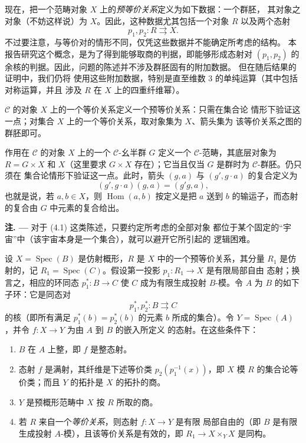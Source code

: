 现在，把一个范畴对象 $X$ 上的\emph{预等价关系}定义为如下数据：一个群胚，
其对象之对象（不妨这样说）为 $X$。因此，这种数据尤其包括一个对象 $R$
以及两个态射
\[
  p_1,p_2:R\rightrightarrows X.
\]
不过要注意，与等价对的情形不同，仅凭这些数据并不能确定所考虑的结构。
本报告研究这个概念，是为了得到能够取商的判据，即能够形成态射对
$(p_1,p_2)$ 的余核的判据。因此，问题的陈述并不涉及群胚固有的附加数据。
但在随后结果的证明中，我们仍将
使用这些附加数据，特别是直至维数 $3$ 的单纯运算（其中包括对称运算，并且
涉及 $R$ 在 $X$ 上的四重纤维幂）。

$\mathcal C$ 的对象 $X$ 上的一个等价关系定义一个预等价关系：只需在集合论
情形下验证这一点；对集合 $X$ 上的一个等价关系，取对象集为 $X$、箭头集为
该等价关系之图的群胚即可。

作用在 $\mathcal C$ 的对象 $X$ 上的一个 $\mathcal C$-幺半群 $G$ 定义一个
$\mathcal C$-范畴，其底层对象为 $R=G\times X$ 和 $X$（这里要求
$G\times X$ 存在）；它当且仅当 $G$ 是群时为 $\mathcal C$-群胚。仍只须在
集合论情形下验证这一点。此时，箭头 $(g,a)$ 与 $(g',g\cdot a)$ 的复合定义为
\[
  (g',g\cdot a)(g,a)=(g'g,a),
\]
也就是说，若 $a,b\in X$，则 $\operatorname{Hom}(a,b)$ 按定义是把 $a$
送到 $b$ 的输运子，而态射的复合由 $G$ 中元素的复合给出。

\medskip
\noindent\textbf{注. ---} 对于 (4.1) 这类陈述，只要约定所考虑的全部对象
都位于某个固定的“宇宙”中（该宇宙本身是一个集合），就可以避开它所引起的
逻辑困难。


 设 $X=\operatorname{Spec}(B)$ 是仿射概形，$R$ 是 $X$
中的一个预等价关系，其分量 $R_1$ 是仿射的，记
$R_1=\operatorname{Spec}(C)$。假设第一投影 $p_1:R_1\to X$ 是有限局部自由
态射；换言之，相应的环同态 $p_1^*:B\to C$ 使 $C$ 成为有限生成投射
$B$-模。令 $A$ 为 $B$ 的如下子环：它是同态对
\[
  p_1^*,p_2^*:B\rightrightarrows C
\]
的核（即所有满足 $p_1^*(b)=p_2^*(b)$ 的元素 $b$ 所成的集合）。令
$Y=\operatorname{Spec}(A)$，并令 $f:X\to Y$ 为由 $A$ 到 $B$ 的嵌入所定义
的态射。在这些条件下：
\begin{enumerate}
\item[(i)] $B$ 在 $A$ 上整，即 $f$ 是整态射。

\item[(ii)] 态射 $f$ 是满射，其纤维是下述等价类
$p_2\allowbreak(p_1^{-1}(x))$，即 $X$ 模 $R$ 的集合论等价类；而且 $Y$
的拓扑是 $X$ 的拓扑的商。

\item[(iii)] $Y$ 是预概形范畴中 $X$ 按 $R$ 所取的商。

\item[(iv)] 若 $R$ 来自一个\emph{等价关系}，则态射 $f:X\to Y$ 是有限
局部自由的（即 $B$ 是有限生成投射 $A$-模），且该等价关系是有效的，即
$R_1\to X\times_Y X$ 是同构。
\end{enumerate}

